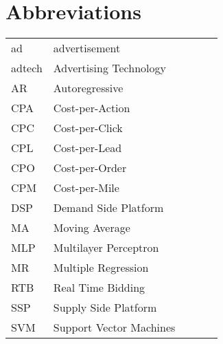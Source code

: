 \chapter*{Abbreviations}

\begin{flushleft}
\begin{tabular}{l p{0.8\linewidth}}
ad    & advertisement\\
adtech   & Advertising Technology\\
AR   & Autoregressive\\
CPA   & Cost-per-Action\\
CPC   & Cost-per-Click\\
CPL   & Cost-per-Lead\\
CPO   & Cost-per-Order\\
CPM   & Cost-per-Mile\\
DSP   & Demand Side Platform\\
MA  & Moving Average\\
MLP & Multilayer Perceptron\\
MR  & Multiple Regression\\
RTB   & Real Time Bidding\\
SSP   & Supply Side Platform\\
SVM   & Support Vector Machines\\
\end{tabular}
\end{flushleft}

